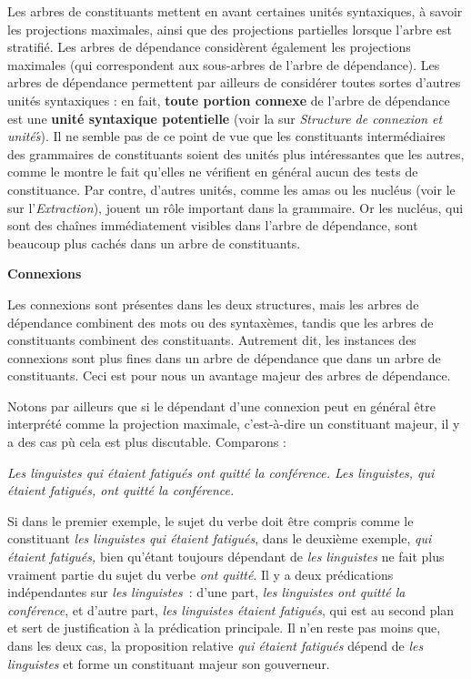 {    Les arbres de constituants mettent en avant certaines unités syntaxiques, à savoir les projections maximales, ainsi que des projections partielles lorsque l’arbre est stratifié. Les arbres de dépendance considèrent également les projections maximales (qui correspondent aux sous-arbres de l’arbre de dépendance). Les arbres de dépendance permettent par ailleurs de considérer toutes sortes d’autres unités syntaxiques : en fait, \textbf{toute portion connexe} de l’arbre de dépendance est une \textbf{unité syntaxique potentielle} (voir la  sur \textit{Structure de connexion et unités}́). Il ne semble pas de ce point de vue que les constituants intermédiaires des grammaires de constituants soient des unités plus intéressantes que les autres, comme le montre le fait qu’elles ne vérifient en général aucun des tests de constituance. Par contre, d’autres unités, comme les amas ou les nucléus (voir le  sur l’\textit{Extraction}), jouent un rôle important dans la grammaire. Or les nucléus, qui sont des chaînes immédiatement visibles dans l’arbre de dépendance, sont beaucoup plus cachés dans un arbre de constituants.

    \smallskip\noindent\textbf{Connexions}

    Les connexions sont présentes dans les deux structures, mais les arbres de dépendance combinent des mots ou des syntaxèmes, tandis que les arbres de constituants combinent des constituants. Autrement dit, les instances des connexions sont plus fines dans un arbre de dépendance que dans un arbre de constituants. Ceci est pour nous un avantage majeur des arbres de dépendance.

    Notons par ailleurs que si le dépendant d’une connexion peut en général être interprété comme la projection maximale, c’est-à-dire un constituant majeur, il y a des cas pù cela est plus discutable. Comparons :

    \ea\itshape
    \ea Les linguistes qui étaient fatigués ont quitté la conférence.
    \ex Les linguistes, qui étaient fatigués, ont quitté la conférence.
    \z
    \z

    Si dans le premier exemple, le sujet du verbe doit être compris comme le constituant \textit{les linguistes qui étaient fatigués}, dans le deuxième exemple, \textit{qui étaient fatigués,} bien qu’étant toujours dépendant de \textit{les linguistes} ne fait plus vraiment partie du sujet du verbe \textit{ont quitté}. Il y a deux prédications indépendantes sur \textit{les linguistes~}: d’une part, \textit{les linguistes ont quitté la conférence}, et d’autre part, \textit{les linguistes étaient fatigués}, qui est au second plan et sert de justification à la prédication principale.
    Il n'en reste pas moins que, dans les deux cas, la proposition relative \textit{qui étaient fatigués} dépend de \textit{les linguistes} et forme un constituant majeur son gouverneur.

}
